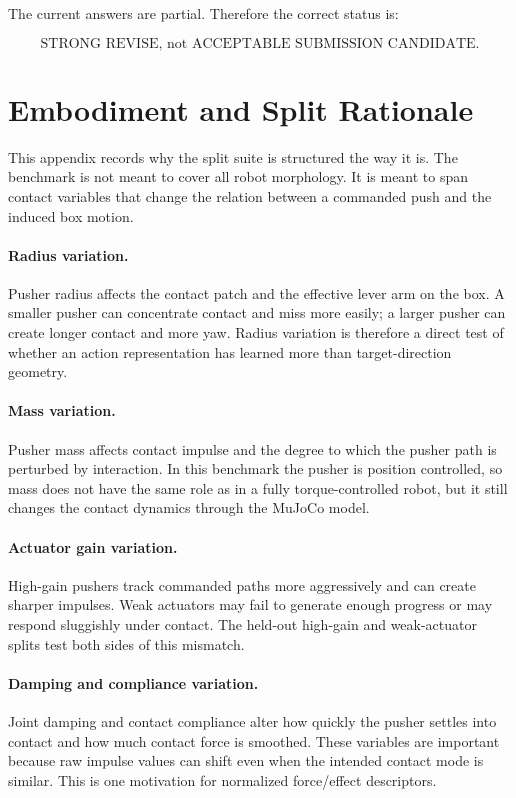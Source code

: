 \documentclass{article}
\begin{document}
The current answers are partial. Therefore the correct status is:

\[
\boxed{\text{STRONG REVISE, not ACCEPTABLE SUBMISSION CANDIDATE.}}
\]

\section{Embodiment and Split Rationale}

This appendix records why the split suite is structured the way it is. The benchmark is not meant to cover all robot morphology. It is meant to span contact variables that change the relation between a commanded push and the induced box motion.

\paragraph{Radius variation.}
Pusher radius affects the contact patch and the effective lever arm on the box. A smaller pusher can concentrate contact and miss more easily; a larger pusher can create longer contact and more yaw. Radius variation is therefore a direct test of whether an action representation has learned more than target-direction geometry.

\paragraph{Mass variation.}
Pusher mass affects contact impulse and the degree to which the pusher path is perturbed by interaction. In this benchmark the pusher is position controlled, so mass does not have the same role as in a fully torque-controlled robot, but it still changes the contact dynamics through the MuJoCo model.

\paragraph{Actuator gain variation.}
High-gain pushers track commanded paths more aggressively and can create sharper impulses. Weak actuators may fail to generate enough progress or may respond sluggishly under contact. The held-out high-gain and weak-actuator splits test both sides of this mismatch.

\paragraph{Damping and compliance variation.}
Joint damping and contact compliance alter how quickly the pusher settles into contact and how much contact force is smoothed. These variables are important because raw impulse values can shift even when the intended contact mode is similar. This is one motivation for normalized force/effect descriptors.
\end{document}
